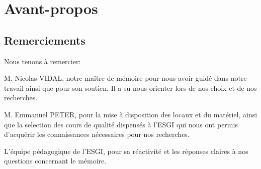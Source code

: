 \documentclass[a4paper, 12pt]{article} %
\makeatletter
\renewcommand{\maketitle}{ %
\begin{flushright} %
{\LARGE\@title} %

\vspace{50pt} %

{\large\@author} %

\vspace{40pt} %
\end{flushright}
}
\makeatother
\begin{document}



%
%


\tableofcontents
\newpage
\section{Avant-propos}
\subsection{Remerciements}
Nous tenons à remercier:

M. Nicolas VIDAL, notre maître de mémoire pour nous avoir guidé dans notre travail ainsi que pour son soutien. Il a su nous orienter lors de nos choix et de nos recherches.

M. Emmanuel PETER, pour la mise à disposition des locaux et du matériel, ainsi que la selection des cours de qualité dispensés à l'ESGI qui nous ont permis d'acquérir les connaissances nécessaires pour nos recherches.

L'équipe pédagogique de l'ESGI, pour sa réactivité et les réponses claires à nos questions concernant le mémoire.
\end{document}
